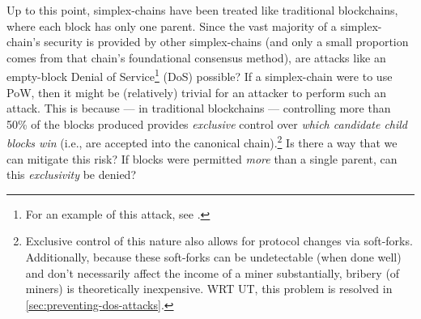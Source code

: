 
Up to this point, simplex-chains have been treated like traditional blockchains, where each block has only one parent.
Since the vast majority of a simplex-chain's security is provided by other simplex-chains (and only a small proportion comes from that chain's foundational consensus method), are attacks like an empty-block Denial of Service\footnote{
    For an example of this attack, see \citeLJCoiledcoinLink.
} (DoS) possible?
If a simplex-chain were to use PoW, then it might be (relatively) trivial for an attacker to perform such an attack.
This is because --- in traditional blockchains --- controlling more than 50\% of the blocks produced provides \emph{exclusive} control over \emph{which candidate child blocks win} (i.e., are accepted into the canonical chain).\footnote{
    Exclusive control of this nature also allows for protocol changes via soft-forks.
    Additionally, because these soft-forks can be undetectable (when done well) and don't necessarily affect the income of a miner substantially, bribery (of miners) is theoretically inexpensive.
    WRT UT, this problem is resolved in \autoref{sec:preventing-dos-attacks}.
}
Is there a way that we can mitigate this risk?
If blocks were permitted \emph{more} than a single parent, can this \emph{exclusivity} be denied?

